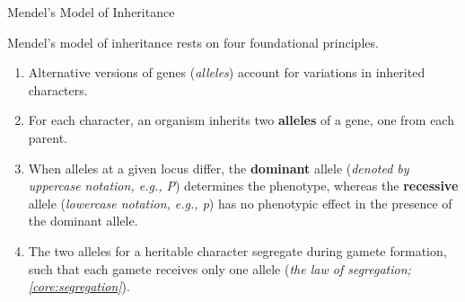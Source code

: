 \documentclass[10pt]{article}
\begin{document}
    \begin{core}{Mendel's Model of Inheritance}

      Mendel's model of inheritance rests on four foundational principles.

      \begin{enumerate}

        \item Alternative versions of genes (\textit{alleles}) account for variations in inherited characters.

        \item For each character, an organism inherits two \textbf{alleles} of a gene, one from each parent.

        \item When alleles at a given locus differ, the \textbf{dominant} allele (\textit{denoted by uppercase notation, e.g., P}) determines the phenotype, whereas the \textbf{recessive} allele (\textit{lowercase notation, e.g., p}) has no phenotypic effect in the presence of the dominant allele.

        \item The two alleles for a heritable character segregate during gamete formation, such that each gamete receives only one allele (\textit{the law of segregation; \autoref{core:segregation}}).

      \end{enumerate}

    \end{core}
\end{document}
